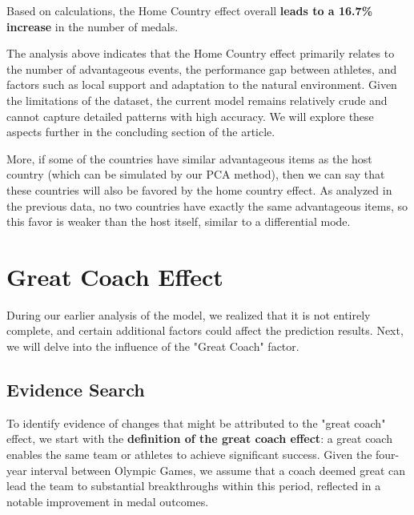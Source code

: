 \documentclass{mcmthesis}
\begin{document}
Based on calculations, the Home Country effect overall \textbf{ leads to a 16.7\% increase} in the number of medals.

The analysis above indicates that the Home Country effect primarily relates to the number of advantageous events, the performance gap between athletes, and factors such as local support and adaptation to the natural environment. Given the limitations of the dataset, the current model remains relatively crude and cannot capture detailed patterns with high accuracy. We will explore these aspects further in the concluding section of the article.


More, if some of the countries have similar advantageous items as the host country (which can be simulated by our PCA method), then we can say that these countries will also be favored by the home country effect. As analyzed in the previous data, no two countries have exactly the same advantageous items, so this favor is weaker than the host itself, similar to a differential mode.

\section{Great Coach Effect}
\label{sec:6}

During our earlier analysis of the model, we realized that it is not entirely complete, and certain additional factors could affect the prediction results. Next, we will delve into the influence of the "Great Coach" factor.

\subsection{Evidence Search}

To identify evidence of changes that might be attributed to the "great coach" effect, we start with the \textbf{definition of the great coach effect}: a great coach enables the same team or athletes to achieve significant success. Given the four-year interval between Olympic Games, we assume that a coach deemed great can lead the team to substantial breakthroughs within this period, reflected in a notable improvement in medal outcomes.
\end{document}
